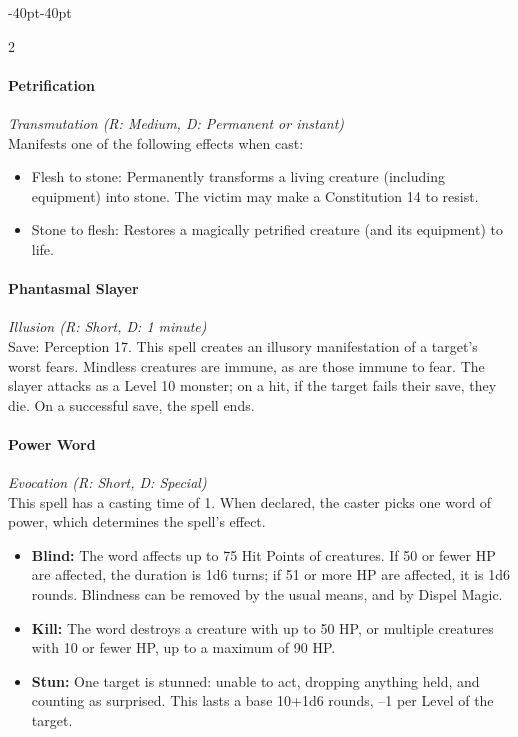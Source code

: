 \documentclass{book}
\providecommand{\tightlist}{%
\setlength{\itemsep}{0pt}\setlength{\parskip}{0pt}}
\begin{document}
\begin{adjustwidth}{-40pt}{-40pt}
\begin{multicols}{2}
\paragraph{Petrification}\label{petrification}

\emph{Transmutation (R: Medium, D: Permanent or instant)}\\
Manifests one of the following effects when cast:

\begin{itemize}
	\tightlist
	\item
	Flesh to stone: Permanently transforms a living creature (including
	equipment) into stone. The victim may make a Constitution 14 to
	resist.
	\item
	Stone to flesh: Restores a magically petrified creature (and its
	equipment) to life.
\end{itemize}

\paragraph{Phantasmal Slayer}\label{phantasmal-slayer}

\emph{Illusion (R: Short, D: 1 minute)}\\
Save: Perception 17. This spell creates an illusory manifestation of a
target's worst fears. Mindless creatures are immune, as are those immune
to fear. The slayer attacks as a Level 10 monster; on a hit, if the
target fails their save, they die. On a successful save, the spell ends.

\paragraph{Power Word}\label{power-word}

\emph{Evocation (R: Short, D: Special)}\\
This spell has a casting time of 1. When declared, the caster picks one
word of power, which determines the spell's effect.

\begin{itemize}
	\tightlist
	\item
	\textbf{Blind:} The word affects up to 75 Hit Points of creatures. If
	50 or fewer HP are affected, the duration is 1d6 turns; if 51 or more
	HP are affected, it is 1d6 rounds. Blindness can be removed by the
	usual means, and by Dispel Magic.
	\item
	\textbf{Kill:} The word destroys a creature with up to 50 HP, or
	multiple creatures with 10 or fewer HP, up to a maximum of 90 HP.
	\item
	\textbf{Stun:} One target is stunned: unable to act, dropping anything
	held, and counting as surprised. This lasts a base 10+1d6 rounds, --1
	per Level of the target.
\end{itemize}


\end{multicols}
\end{adjustwidth}
\end{document}
